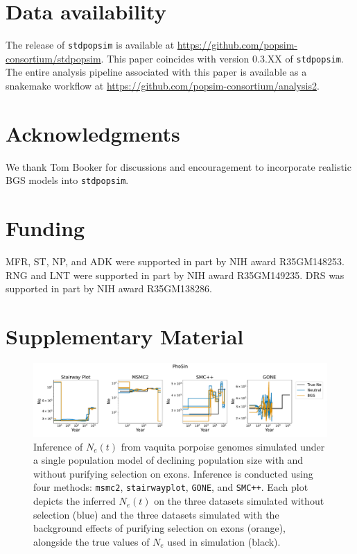 \documentclass[hidelinks]{article}
\newcommand{\stdpopsim}{\texttt{stdpopsim}\xspace}
\newcommand{\beginsupplement}{%
        \fancyhead[L]{Supplemental Material}
        \setcounter{table}{0}
        \renewcommand{\thetable}{S\arabic{table}}%
        \setcounter{figure}{0}
        \renewcommand{\thefigure}{S\arabic{figure}}%
     }
\newcommand{\msmc}{\texttt{msmc2}\xspace}
\newcommand{\stairway}{\texttt{stairwayplot}\xspace}
\newcommand{\gone}{\texttt{GONE}\xspace}
\newcommand{\smcpp}{\texttt{SMC++}\xspace}
\begin{document}
\section*{Data availability}\label{data_availability}
The release of \stdpopsim is available at \url{https://github.com/popsim-consortium/stdpopsim}.
This paper coincides with version 0.3.XX of \stdpopsim. %
The entire analysis pipeline associated with this paper is available
as a snakemake workflow at \url{https://github.com/popsim-consortium/analysis2}.

\section*{Acknowledgments}\label{acknowledgements}
We thank Tom Booker for discussions and encouragement to incorporate realistic BGS models into \stdpopsim.

\section*{Funding}
    \label{funding}
    MFR, ST, NP, and ADK were supported in part by NIH award R35GM148253.
    RNG and LNT were supported in part by NIH award R35GM149235.
    DRS was supported in part by NIH award R35GM138286.

\printbibliography

\clearpage
\beginsupplement

\section*{Supplementary Material}

\begin{figure}[b!]
    \centering
    \includegraphics[width=\textwidth]{figures/PhoSin/Vaquita2Epoch_1R22/estimated_Ne_t_final.pdf}
    \caption{
    \label{fig:vaquita-demography}
    Inference of $N_e(t)$ from vaquita porpoise genomes simulated under a single population 
    model of declining population size \citep{robinson2022critically}
    with and without purifying selection on exons. 
    Inference is conducted using four methods:    
    \msmc \citep{Schiffels2020}, \stairway \citep{liu2020stairway}, \gone \citep{santiago2020recent}, and \smcpp \citep{terhorst2017robust}.
    Each plot depicts the inferred $N_e(t)$ on the three datasets simulated without selection (blue)
    and the three datasets simulated with the background effects of purifying selection on exons (orange),
    alongside the true values of $N_e$ used in simulation (black).
}
\end{figure}
\end{document}
